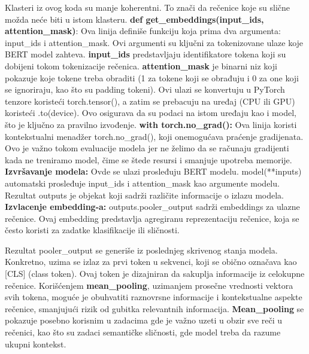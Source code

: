 \documentclass{article}
\begin{document}
Klasteri iz ovog koda su manje koherentni. To znači da rečenice koje su slične možda neće biti u istom klasteru.
\newline
\newline
\textbf{def get\_embeddings(input\_ids, attention\_mask)}: Ova linija definiše funkciju koja prima dva argumenta: input\_ids i attention\_mask. Ovi argumenti su ključni za tokenizovane ulaze koje BERT model zahteva.
\newline
\newline
\textbf{input\_ids} predstavljaju identifikatore tokena koji su dobijeni tokom tokenizacije rečenica. \textbf{attention\_mask} je binarni niz koji pokazuje koje tokene treba obraditi (1 za tokene koji se obrađuju i 0 za one koji se ignoriraju, kao što su padding tokeni).
\newline
\newline
Ovi ulazi se konvertuju u PyTorch tenzore koristeći torch.tensor(), a zatim se prebacuju na uređaj (CPU ili GPU) koristeći .to(device). Ovo osigurava da su podaci na istom uređaju kao i model, što je ključno za pravilno izvođenje.
\newline
\newline
\textbf{with torch.no\_grad():} Ova linija koristi kontekstualni menadžer torch.no\_grad(), koji onemogućava praćenje gradijenata. Ovo je važno tokom evaluacije modela jer ne želimo da se računaju gradijenti kada ne treniramo model, čime se štede resursi i smanjuje upotreba memorije.
\newline
\newline
\textbf{Izvršavanje modela:} Ovde se ulazi prosleđuju BERT modelu. model(**inputs) automatski prosleđuje input\_ids i attention\_mask kao argumente modelu. Rezultat outputs je objekat koji sadrži različite informacije o izlazu modela.
\newline
\newline
\textbf{Izvlacenje embedding-a:} outputs.pooler\_output sadrži embeddings za ulazne rečenice. Ovaj embedding predstavlja agregiranu reprezentaciju rečenice, koja se često koristi za zadatke klasifikacije ili sličnosti.

\newpage
Rezultat pooler\_output se generiše iz poslednjeg skrivenog stanja modela. Konkretno, uzima se izlaz za prvi token u sekvenci, koji se obično označava kao [CLS] (class token). Ovaj token je dizajniran da sakuplja informacije iz celokupne rečenice.
\newline
\newline
Korišćenjem \textbf{mean\_pooling}, uzimanjem prosečne vrednosti vektora svih tokena, moguće je obuhvatiti raznovrsne informacije i kontekstualne aspekte rečenice, smanjujući rizik od gubitka relevantnih informacija. \textbf{Mean\_pooling} se pokazuje posebno korisnim u zadacima gde je važno uzeti u obzir sve reči u rečenici, kao što su zadaci semantičke sličnosti, gde model treba da razume ukupni kontekst.
\end{document}
